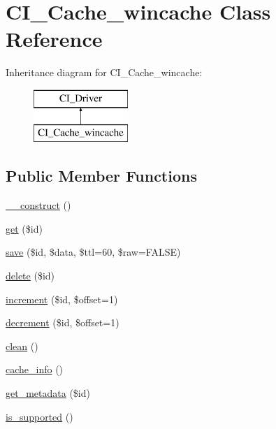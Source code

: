 \hypertarget{class_c_i___cache__wincache}{}\section{C\+I\+\_\+\+Cache\+\_\+wincache Class Reference}
\label{class_c_i___cache__wincache}
Inheritance diagram for C\+I\+\_\+\+Cache\+\_\+wincache\+:\begin{figure}[H]
\begin{center}
\leavevmode
\includegraphics[height=2.000000cm]{class_c_i___cache__wincache}
\end{center}
\end{figure}
\subsection*{Public Member Functions}
\begin{DoxyCompactItemize}
\item 
\mbox{\hyperlink{class_c_i___cache__wincache_a095c5d389db211932136b53f25f39685}{\+\_\+\+\_\+construct}} ()
\item 
\mbox{\hyperlink{class_c_i___cache__wincache_a50e3bfb586b2f42932a6a93f3fbb0828}{get}} (\$id)
\item 
\mbox{\hyperlink{class_c_i___cache__wincache_a472645db04a8ce4b040b789a3062a7d2}{save}} (\$id, \$data, \$ttl=60, \$raw=F\+A\+L\+SE)
\item 
\mbox{\hyperlink{class_c_i___cache__wincache_a2f8258add505482d7f00ea26493a5723}{delete}} (\$id)
\item 
\mbox{\hyperlink{class_c_i___cache__wincache_a2f07a4e09b57f4460d49852497d1808f}{increment}} (\$id, \$offset=1)
\item 
\mbox{\hyperlink{class_c_i___cache__wincache_a4eb1c2772c8efc48c411ea060dd040b7}{decrement}} (\$id, \$offset=1)
\item 
\mbox{\hyperlink{class_c_i___cache__wincache_adb40b812890a8bc058bf6b7a0e1a54d9}{clean}} ()
\item 
\mbox{\hyperlink{class_c_i___cache__wincache_acb4742926a6fa901e4f0917e1a35ef4c}{cache\+\_\+info}} ()
\item 
\mbox{\hyperlink{class_c_i___cache__wincache_a59635cf18e997c5141bffa05ff7622e0}{get\+\_\+metadata}} (\$id)
\item 
\mbox{\hyperlink{class_c_i___cache__wincache_a98c68fd153468bc148c4ed8c716859fc}{is\+\_\+supported}} ()
\end{DoxyCompactItemize}
